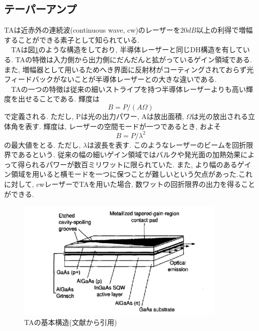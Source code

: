\documentclass[uplatex, dvipdfmx, a4paper, report, papersize, 11pt]{jsbook}
\begin{document}
\subsection{テーパーアンプ}
 TAは近赤外の連続波(continuous wave,  cw)のレーザーを$20 dB$以上の利得で増幅することができる素子として知られている\cite{Cruz:06}.\\
　TAは図\ref{TA_structure}のような構造をしており, 半導体レーザーと同じDH構造を有している. TAの特徴は入力側から出力側にだんだんと拡がっているゲイン領域である. また, 増幅器として用いるためへき界面に反射材がコーティングされておらず光フィードバックがないことが半導体レーザーとの大きな違いである.\\
　TAの一つの特徴は従来の細いストライプを持つ半導体レーザーよりも高い輝度を出せることである. 輝度は
 \begin{equation}
   B = P/(A\Omega)
 \end{equation}
で定義される. ただし, Pは光の出力パワー, Aは放出面積, $\Omega$は光の放出される立体角を表す. 輝度は, レーザーの空間モードが一つであるとき, およそ
\begin{equation}
  B = P/\lambda^2
\end{equation}
の最大値をとる\cite{Walpole1996}. ただし, $\lambda$は波長を表す. このようなレーザーのビームを回折限界であるという. 従来の幅の細いゲイン領域ではバルクや発光面の加熱効果によって得られるパワーが数百ミリワットに限られていた. また, より幅のあるゲイン領域を用いると横モードを一つに保つことが難しいという欠点があった.これに対して, cwレーザーでTAを用いた場合, 数ワットの回折限界の出力を得ることができる\cite{Walpole1996}.


\begin{figure}[htbp]
 \begin{center}
  \includegraphics[width=100mm]{figures/chapter2/TA_structure.png}
 \end{center}
 \caption{TAの基本構造(文献\cite{Walpole1996}から引用)}
 \label{TA_structure}
\end{figure}
\newpage
\end{document}
